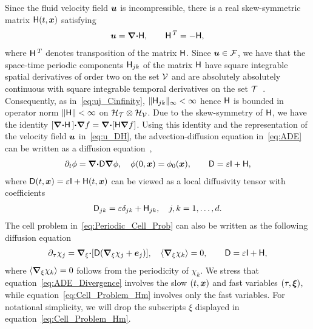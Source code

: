 \documentclass[amsa]{ipart}
\begin{document}
Since the fluid velocity field $\boldsymbol{u}$ is incompressible, there is a
real skew-symmetric matrix $\mathsf{H}(t,\boldsymbol{x})$
satisfying~\cite{Avellaneda:PRL-753,Avellaneda:CMP-339}   
% 
\begin{align}\label{eq:u_DH}
 \vecu =\bnabla \bcdot\Hm, \qquad   \Hm^{\,T}=-\Hm,
\end{align}
% 
where $\mathsf{H}^{\,T}$ denotes transposition of the matrix $\mathsf{H}$. Since
$\boldsymbol{u}\in\mathcal{F}$, we have that the space-time periodic components
$\mathsf{H}_{jk}$ of the matrix $\mathsf{H}$ have square integrable spatial
derivatives of order two on the set $\mathcal{V}$ and are absolutely
absolutely continuous with square integrable temporal derivatives on
the set $\mathcal{T}$~\cite{Bhattacharya:AAP:1999:951}. Consequently, as
in~\eqref{eq:uj_Cinfinity}, $\|\mathsf{H}_{jk}\|_\infty<\infty$ hence $\mathsf{H}$ is bounded in
operator norm $\|\mathsf{H}\|<\infty$ on $\mathcal{H}_{\mathcal{T}}\otimes\mathcal{H}_{\mathcal{V}}$. Due to  
the skew-symmetry of $\mathsf{H}$, we have the identity
$[\mbox{\boldmath${\nabla}$}\mbox{\boldmath${\cdot}$}\mathsf{H}\,]\mbox{\boldmath${\cdot}$}\mbox{\boldmath${\nabla}$} f=\mbox{\boldmath${\nabla}$}\mbox{\boldmath${\cdot}$}[\mathsf{H}\mbox{\boldmath${\nabla}$} f]$. Using
this identity and the representation of the velocity field $\boldsymbol{u}$
in~\eqref{eq:u_DH}, the advection-diffusion equation in~\eqref{eq:ADE}
can be written as a diffusion
equation~\cite{Fannjiang:1994:SIAM_JAM:333},    
%
\begin{align}\label{eq:ADE_Divergence}
  \partial_t\phi%
    =\bnabla \bcdot\Dm\bnabla \phi, \quad
    \phi(0,\vecx)=\phi_0(\vecx),
    \qquad
    \Dm=\varepsilon\Ib+\Hm,
\end{align}
%
where $\mathsf{D}(t,\boldsymbol{x})=\varepsilon\mathsf{I}+\mathsf{H}(t,\boldsymbol{x})$ can be viewed as a local
diffusivity tensor with coefficients
%
\begin{align}\label{eq:kappa_coeff}
  \Dm_{jk}=\varepsilon\delta_{jk}+\Hm_{jk},\quad j,k=1,\ldots,d.
\end{align}
%
The cell problem in~\eqref{eq:Periodic_Cell_Prob} can also be
written as the following diffusion
equation~\cite{Fannjiang:1994:SIAM_JAM:333}     
% 
\begin{align}\label{eq:Cell_Problem_Hm}
  \partial_\tau\chi_j=\bnabla_\xi \bcdot[\Dm(\bnabla_\xi \chi_j+\vece_j)],
  \quad
  \langle\bnabla_\xi \chi_k\rangle=0, \qquad
  \Dm=\varepsilon\Ib+\Hm,
\end{align}
%
where $\langle\mbox{\boldmath${\nabla}$}_\xi \chi_k\rangle=0$ follows from the periodicity of $\chi_k$. We
stress that equation~\eqref{eq:ADE_Divergence} involves the slow
$(t,\boldsymbol{x})$ and fast variables $(\tau,\boldsymbol{\xi})$, while
equation~\eqref{eq:Cell_Problem_Hm} involves only the fast variables. 
For notational simplicity, we will drop the subscripts $\xi$ displayed
in equation~\eqref{eq:Cell_Problem_Hm}. 
\end{document}

